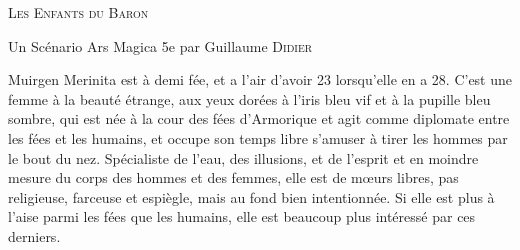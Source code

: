 \begin{center}
\vfill
    {\Large\scshape Les Enfants du Baron\par}
    \vspace{0.5cm}
{Un Scénario Ars Magica 5e par Guillaume \textsc{Didier}\par}
    \vfill
    {\LARGE\bfseries \magusname \par}



\vfill
    \begin{center}
        \parbox{.8\textwidth}{
            Muirgen Merinita est à demi fée, et a l'air d'avoir 23 lorsqu'elle en a 28. C'est une femme à la beauté étrange, aux yeux dorées à l'iris bleu vif et à la pupille bleu sombre, qui est née à la cour des fées d'Armorique et agit comme diplomate entre les fées et les humains, et occupe son temps libre s'amuser à tirer les hommes par le bout du nez. Spécialiste de l'eau, des illusions, et de l'esprit et en moindre mesure du corps des hommes et des femmes, elle est de mœurs libres, pas religieuse, farceuse et espiègle, mais au fond bien intentionnée. Si elle est plus à l'aise parmi les fées que les humains, elle est beaucoup plus intéressé par ces derniers.}
    \end{center}
\vfill
\end{center}
\pagebreak

\shortsheet{}




